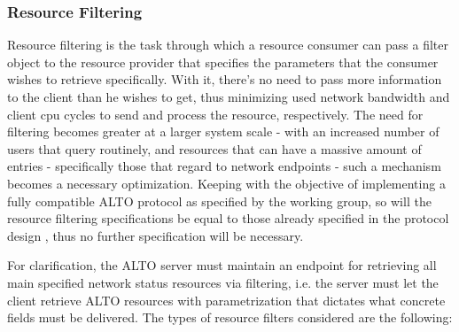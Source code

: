 \subsubsection{Resource Filtering}

    Resource filtering is the task through which a resource consumer can pass a filter object to the resource provider that specifies the parameters that the consumer wishes to retrieve specifically.
    With it, there's no need to pass more information to the client than he wishes to get, thus minimizing used network bandwidth and client cpu cycles to send and process the resource, respectively.
    The need for filtering becomes greater at a larger system scale - with an increased number of users that query routinely, and resources that can have a massive amount of entries - specifically those that regard to network endpoints - such a mechanism becomes a necessary optimization.
    Keeping with the objective of implementing a fully compatible ALTO protocol as specified by the working group, so will the resource filtering specifications be equal to those already specified in the protocol design \cite{alto-protocol}, thus no further specification will be necessary.

    For clarification, the ALTO server must maintain an endpoint for retrieving all main specified network status resources via filtering, i.e. the server must let the client retrieve ALTO resources with parametrization that dictates what concrete fields must be delivered.
    The types of resource filters considered are the following:

